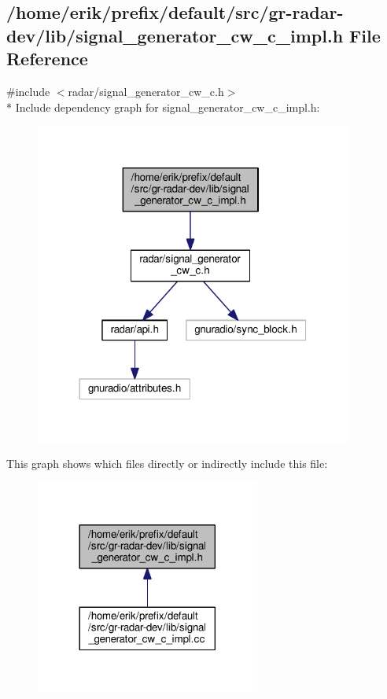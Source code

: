 \subsection{/home/erik/prefix/default/src/gr-\/radar-\/dev/lib/signal\+\_\+generator\+\_\+cw\+\_\+c\+\_\+impl.h File Reference}
\label{signal__generator__cw__c__impl_8h}
{\ttfamily \#include $<$radar/signal\+\_\+generator\+\_\+cw\+\_\+c.\+h$>$}\\*
Include dependency graph for signal\+\_\+generator\+\_\+cw\+\_\+c\+\_\+impl.\+h\+:
\nopagebreak
\begin{figure}[H]
\begin{center}
\leavevmode
\includegraphics[width=296pt]{d5/da3/signal__generator__cw__c__impl_8h__incl}
\end{center}
\end{figure}
This graph shows which files directly or indirectly include this file\+:
\nopagebreak
\begin{figure}[H]
\begin{center}
\leavevmode
\includegraphics[width=209pt]{db/d33/signal__generator__cw__c__impl_8h__dep__incl}
\end{center}
\end{figure}
